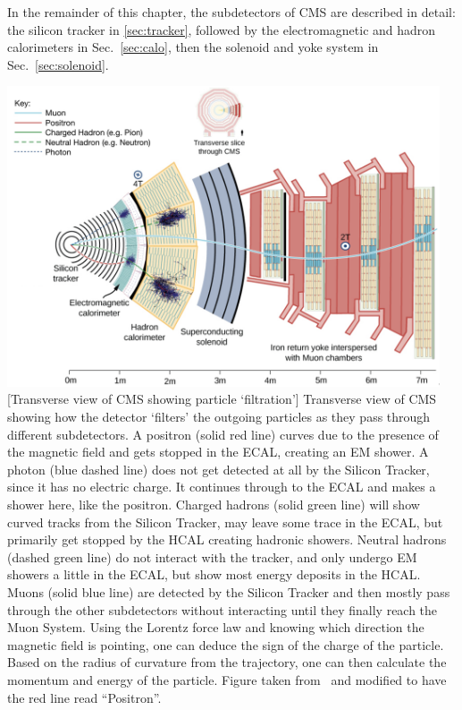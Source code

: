 In the remainder of this chapter, the subdetectors of CMS are described in detail:
the silicon tracker in \cref{sec:tracker},
followed by the electromagnetic and hadron calorimeters in Sec.~\ref{sec:calo},
then the solenoid and yoke system in Sec.~\ref{sec:solenoid}.
\begin{multiFigure}
    \centering
        \includegraphics[width=0.96\textwidth,keepaspectratio]{figures/cms/cms_transverse_particletrajectories_corrected.png}
        [Transverse view of CMS showing particle `filtration']
        {Transverse view of CMS showing how the detector `filters' the outgoing particles as they pass through different subdetectors.
        A positron (solid red line) curves due to the presence of the magnetic field and gets stopped in the ECAL, creating an EM shower.
        A photon (blue dashed line) does not get detected at all by the Silicon Tracker, since it has no electric charge.
        It continues through to the ECAL and makes a shower here, like the positron.
        Charged hadrons (solid green line) will show curved tracks from the Silicon Tracker, may leave some trace in the ECAL, but primarily get stopped by the HCAL creating hadronic showers.
        Neutral hadrons (dashed green line) do not interact with the tracker, and only undergo EM showers a little in the ECAL, but show most energy deposits in the HCAL.
        Muons (solid blue line) are detected by the Silicon Tracker and then mostly pass through the other subdetectors without interacting until they finally reach the Muon System.
        Using the Lorentz force law and knowing which direction the magnetic field is pointing, one can deduce the sign of the charge of the particle. 
        Based on the radius of curvature from the trajectory, one can then calculate the momentum and energy of the particle.
        Figure taken from~\cite{cms_filter} and modified to have the red line read ``Positron''.} 
    \label{fig:cms_particle_trajectories}
\end{multiFigure}


